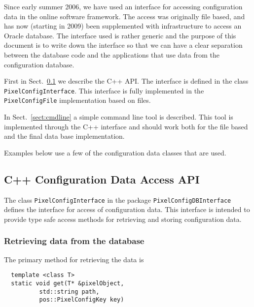 
Since early summer 2006, we have used an interface for accessing
configuration data in the online software framework. 
The access was originally file based, and has now (starting in 2009) been
supplemented with infrastructure to access an Oracle database. The 
interface used is rather generic and the purpose of this document
is to write down the interface so that we can have a 
clear separation between the database code and the applications 
that use data from the configuration database.

First in Sect.~\ref{sect:cppinterface} we describe the C++ API.
The interface is defined in the class {\tt PixelConfigInterface}.
This interface is fully implemented in the {\tt PixelConfigFile}
implementation based on files.

In Sect.~\ref{sect:cmdline} a simple command line tool is described.
This tool is implemented through the C++ interface and should work
both for the file based and the final data base implementation.

Examples below use a few of the configuration data classes that are used. 

\subsection{C++ Configuration Data Access API}
\label{sect:cppinterface} 

The class {\tt PixelConfigInterface} in the package 
{\tt PixelConfigDBInterface} defines the interface for
access of configuration data. This interface is intended
to provide type safe access methods for retrieving and
storing configuration data.

\subsubsection{Retrieving data from the database}

The primary method for retrieving the data is
\begin{verbatim}
  template <class T>
  static void get(T* &pixelObject,
		  std::string path,
		  pos::PixelConfigKey key)
\end{verbatim}

